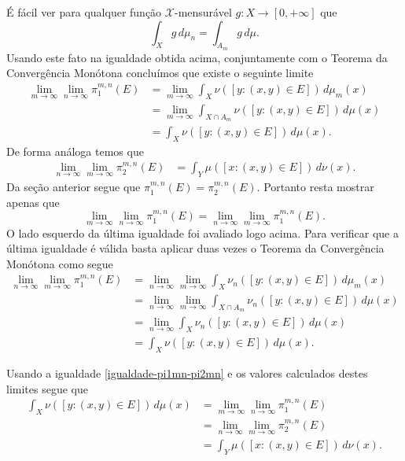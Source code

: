 É fácil ver para qualquer função $\mathscr{X}$-mensurável $g:X\to [0,+\infty]$ que 
\[
\int_X g \,d\mu_n = \int_{A_m} g\, d\mu.
\]
Usando este fato na igualdade obtida acima, conjuntamente 
com o Teorema da Convergência Monótona concluímos que
existe o seguinte limite 
\begin{align*}
\lim_{m\to\infty} \lim_{n\to\infty}\pi_1^{m,n}(E)
&=
\lim_{m\to\infty}\int_X \nu([y:(x,y)\in E ])\, d\mu_m(x)
\\
&=
\lim_{m\to\infty}\int_{X\cap A_m} \nu([y:(x,y)\in E ])\, d\mu(x)
\\
&=
\int_{X} \nu([y:(x,y)\in E ])\, d\mu(x).
\end{align*}
De forma análoga temos que 
\begin{align*}
\lim_{n\to\infty} \lim_{m\to\infty}\pi_2^{m,n}(E)
&=
\int_{Y} \mu([x:(x,y)\in E ])\, d\nu(x).
\end{align*}
Da seção anterior segue que $\pi_1^{m,n}(E)= \pi_2^{m,n}(E)$. Portanto
resta mostrar apenas que 
\begin{equation}\label{igualdade-pi1mn-pi2mn}
\lim_{m\to\infty}\lim_{n\to\infty} \pi_1^{m,n}(E)
=
\lim_{n\to\infty}\lim_{m\to\infty} \pi_1^{m,n}(E).
\end{equation}
O lado esquerdo da última igualdade foi avaliado logo acima. 
Para verificar que a última igualdade é válida basta aplicar duas vezes o
Teorema da Convergência Monótona como segue
\begin{align*}
\lim_{n\to\infty}\lim_{m\to\infty} \pi_1^{m,n}(E)
&=
\lim_{n\to\infty}\lim_{m\to\infty}
\int_X \nu_n([y:(x,y)\in E ])\, d\mu_m(x)
\\
&=
\lim_{n\to\infty}\lim_{m\to\infty}
\int_{X\cap A_m} \nu_n([y:(x,y)\in E ])\, d\mu(x)
\\
&=
\lim_{n\to\infty}
\int_{X} \nu_n([y:(x,y)\in E ])\, d\mu(x)
\\
&=
\int_{X} \nu([y:(x,y)\in E ])\, d\mu(x).
\end{align*} 

Usando a igualdade \eqref{igualdade-pi1mn-pi2mn} e os valores 
calculados destes limites segue que 
\begin{align*}
\int_{X} \nu([y:(x,y)\in E ])\, d\mu(x)
&=
\lim_{m\to\infty} \lim_{n\to\infty}\pi_1^{m,n}(E)
\\
&=
\lim_{n\to\infty} \lim_{m\to\infty}\pi_2^{m,n}(E)
\\
&=
\int_{Y} \mu([x:(x,y)\in E ])\, d\nu(x).
\end{align*}



